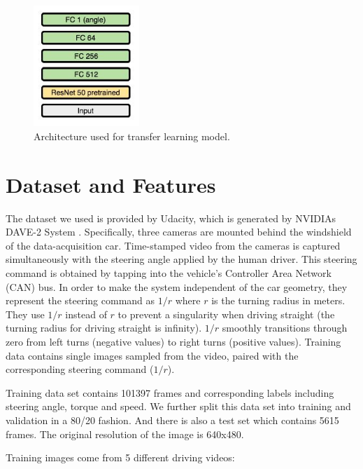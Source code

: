 \documentclass[10pt,twocolumn,letterpaper]{article}
\begin{document}
\begin{figure}[!htb!]
	\includegraphics[width=4cm]{resnet50trans.JPG}
	\centering
	\caption{Architecture used for transfer learning model.}
	\label{resnet50}
\end{figure}







\section{Dataset and Features}
The dataset we used is provided by Udacity, which is generated by NVIDIAs DAVE-2 System \cite{bojarski2016end}. Specifically, three cameras are mounted behind the windshield of the data-acquisition car. Time-stamped video from the cameras is captured simultaneously with the steering angle applied by the human driver. This steering command is obtained by tapping into the vehicle's Controller Area Network (CAN) bus. In order to make the system independent of the car geometry, they represent the steering command as $1/r$ where $r$ is the turning radius in meters. They use $1/r$ instead of $r$ to prevent a singularity when driving straight (the turning radius for driving straight is infinity). $1/r$ smoothly transitions through zero from left turns (negative values) to right turns (positive values). Training data contains single images sampled from the video, paired with the corresponding steering command ($1/r$).

Training data set contains 101397 frames and corresponding labels including steering angle, torque and speed. We further split this data set into training and validation in a 80/20 fashion. And there is also a test set which contains 5615 frames. The original resolution of the image is 640x480.

Training images come from 5 different driving videos:\\
\end{document}
